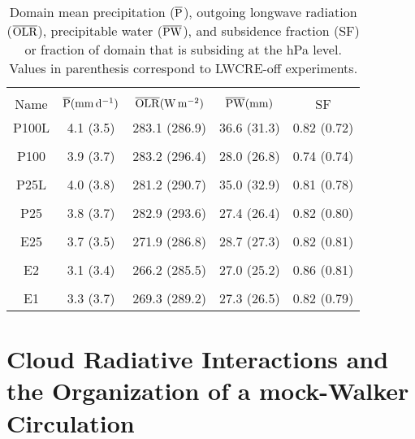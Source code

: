 \documentclass[draft]{agujournal2019}
\begin{document}
\begin{table}
\begin{center}
\caption{Domain mean precipitation ($\overline{\rm{P}}$), outgoing longwave radiation 
($\overline{\rm{OLR}}$), precipitable water ($\overline{\rm{PW}}$), and subsidence fraction (SF)  
or fraction of domain that is subsiding at the  hPa level.
Values in parenthesis correspond to LWCRE-off experiments.}
    \begin{tabular}{*{5}{c}}
    \hline
    \hline
    \\
 Name &   $\overline{\rm{P}} (\mathrm{mm \,d^{-1}})$ & $\overline{\rm{OLR}} (\rm{W \, m^{-2}})$ & $\overline{\rm{PW}} (\rm{mm})$ & SF   \\ \hline
  P100L   &  4.1 (3.5)   &  283.1 (286.9)  & 36.6 (31.3)  & 0.82 (0.72)      \\ 
    \\
  P100 &   3.9 (3.7)   &  283.2 (296.4)  & 28.0 (26.8) & 0.74 (0.74)           \\  
    \\
  P25L &   4.0 (3.8)  &  281.2 (290.7)   & 35.0 (32.9) & 0.81 (0.78)          \\  
    \\
  P25  &   3.8 (3.7)    & 282.9 (293.6)   & 27.4 (26.4) & 0.82 (0.80)          \\  
    \\
 E25  & 3.7 (3.5)    &   271.9 (286.8)   & 28.7 (27.3) & 0.82 (0.81)            \\  
    \\
 E2   &  3.1 (3.4)   &  266.2 (285.5)    & 27.0 (25.2) & 0.86 (0.81)           \\ 
    \\
 E1   &  3.3 (3.7)   &  269.3 (289.2)    & 27.3 (26.5) & 0.82 (0.79)         \\  \hline

    \end{tabular}\par
    \label{tab:experimentmeans}
\end{center}
\end{table}



\section{Cloud Radiative Interactions and the Organization of a mock-Walker Circulation}

\subsection{}
\end{document}
